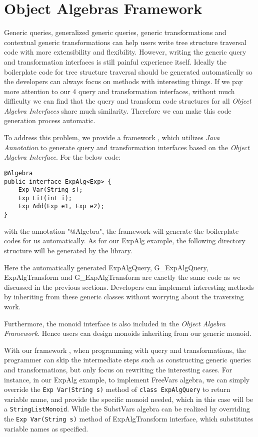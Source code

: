 \section{Object Algebras Framework}

Generic queries, generalized generic queries, generic transformations and contextual generic transformations can help users write tree structure traversal code with more extensibility and flexibility. However, writing the generic query and transformation interfaces is still painful experience itself. Ideally the boilerplate code for tree structure traversal should be generated automatically so the developers can always focus on methods with interesting things. If we pay more attention to our 4 query and transformation interfaces, without much difficulty we can find that the query and transform code structures for all \emph{Object Algebra Interfaces} share much similarity. Therefore we can make this code generation process automatic. 

To address this problem, we provide a framework \name, which utilizes \emph{Java Annotation} to generate query and transformation interfaces based on the \emph{Object Algebra Interface}. For the below code: 
\begin{lstlisting}[numbers=none] 
@Algebra
public interface ExpAlg<Exp> {
	Exp Var(String s);
	Exp Lit(int i);
	Exp Add(Exp e1, Exp e2);
}
\end{lstlisting}
with the annotation "$@$Algebra", the framework will generate the boilerplate codes for us automatically. As for our ExpAlg example, the following directory structure will be generated by the library.

\begin{comment}
\dirtree{%
 .1 src/.
 .2 query/.
 .3 ExpAlgQuery.
 .3 G\_ExpAlgQuery.
 .2 transform/.
 .3 ExpAlgTransform.
 .3 G\_ExpAlgTransform.
}
\end{comment}

Here the automatically generated ExpAlgQuery, G\_ExpAlgQuery, ExpAlgTransform and G\_ExpAlgTransform are exactly the same code as we discussed in the previous sections. Developers can implement interesting methods by inheriting from these generic classes without worrying about the traversing work.

Furthermore, the monoid interface is also included in the \emph{Object Algebra Framework}. Hence users can design monoids inheriting from our generic monoid. 

With our framework \name, when programming with query and transformations, the programmer can skip the intermediate steps such as constructing generic queries and transformations, but only focus on rewriting the interesting cases. For instance, in our ExpAlg example, to implement FreeVars algebra, we can simply override the \lstinline{Exp Var(String s)} method of \lstinline{class ExpAlgQuery} to return variable name, and provide the specific monoid needed, which in this case will be a \lstinline{StringListMonoid}. While the SubstVars algebra can be realized by overriding the \lstinline{Exp Var(String s)} method of ExpAlgTransform interface, which substitutes variable names as specified. 
